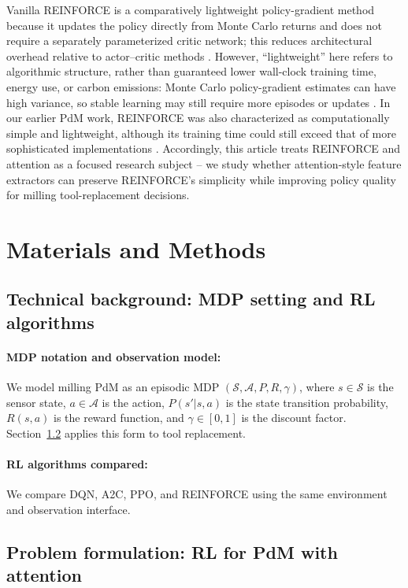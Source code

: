\documentclass[sn-basic]{sn-jnl}%
\begin{document}
Vanilla \textsc{REINFORCE} is a comparatively lightweight policy-gradient method because it updates the policy directly from Monte Carlo returns and does not require a separately parameterized critic network; this reduces architectural overhead relative to actor--critic methods \cite{Williams1992,Sutton1999,Sutton2001}. However, ``lightweight'' here refers to algorithmic structure, rather than guaranteed lower wall-clock training time, energy use, or carbon emissions: Monte Carlo policy-gradient estimates can have high variance, so stable learning may still require more episodes or updates \cite{Greensmith2005}. In our earlier PdM work, \textsc{REINFORCE} was also characterized as computationally simple and lightweight, although its training time could still exceed that of more sophisticated implementations \cite{Siraskar2025}. Accordingly, this article treats \textsc{REINFORCE} and attention as a focused research subject -- we study whether attention-style feature extractors can preserve REINFORCE's simplicity while improving policy quality for milling tool-replacement decisions.

\section{Materials and Methods}\label{sec:method}

\subsection{Technical background: MDP setting and RL algorithms}\label{sec:tech_background}
\paragraph{MDP notation and observation model:}
We model milling PdM as an episodic MDP $(\mathcal{S},\mathcal{A},P,R,\gamma)$, where $s \in \mathcal{S}$ is the sensor state, $a \in \mathcal{A}$ is the action, $P(s'|s,a)$ is the state transition probability, $R(s,a)$ is the reward function, and $\gamma \in [0,1]$ is the discount factor. Section~\ref{sec:env} applies this form to tool replacement.

\paragraph{RL algorithms compared:}
We compare DQN, A2C, PPO, and \textsc{REINFORCE} using the same environment and observation interface.

\subsection{Problem formulation: RL for PdM with attention} \label{sec:env} \label{app:env_reward}
\end{document}
